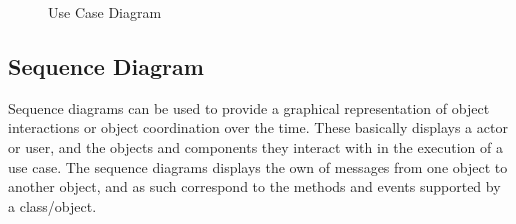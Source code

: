 \documentclass[oneside,a4paper,12pt]{report}
\begin{document}
\begin{center}
	\begin{figure}[!htbp]
		\centering
	    \caption{Use Case Diagram}
	    \label{fig:Use Case Diagram}
	\end{figure}
\end{center}

\newpage
\subsection{Sequence Diagram}
\hspace*{0.5cm} Sequence diagrams can be used to provide a graphical representation of object  interactions or object coordination over the time. These basically displays a actor or user, and the objects and components they interact with in the execution of a use case. The sequence diagrams displays the own of messages from one object to another object, and as such correspond to the methods and events supported by a class/object.
\end{document}
